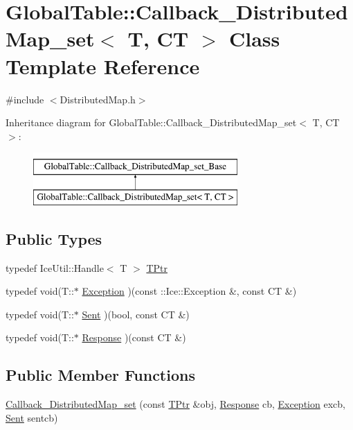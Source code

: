 \hypertarget{class_global_table_1_1_callback___distributed_map__set}{
\section{GlobalTable::Callback\_\-DistributedMap\_\-set$<$ T, CT $>$ Class Template Reference}
\label{class_global_table_1_1_callback___distributed_map__set}
}


{\ttfamily \#include $<$DistributedMap.h$>$}

Inheritance diagram for GlobalTable::Callback\_\-DistributedMap\_\-set$<$ T, CT $>$:\begin{figure}[H]
\begin{center}
\leavevmode
\includegraphics[height=2cm]{class_global_table_1_1_callback___distributed_map__set}
\end{center}
\end{figure}
\subsection*{Public Types}
\begin{DoxyCompactItemize}
\item 
typedef IceUtil::Handle$<$ T $>$ \hyperlink{class_global_table_1_1_callback___distributed_map__set_a3b50a68a36ed6f9c18c2f43921e7d2e9}{TPtr}
\item 
typedef void(T::$\ast$ \hyperlink{class_global_table_1_1_callback___distributed_map__set_a35bb7faf0c39455b3c6216c7c2d35b0f}{Exception} )(const ::Ice::Exception \&, const CT \&)
\item 
typedef void(T::$\ast$ \hyperlink{class_global_table_1_1_callback___distributed_map__set_acb1788ee23e85c2b36536177fc33e7d7}{Sent} )(bool, const CT \&)
\item 
typedef void(T::$\ast$ \hyperlink{class_global_table_1_1_callback___distributed_map__set_aff2fdd8c179bf018ed543b3153991bf9}{Response} )(const CT \&)
\end{DoxyCompactItemize}
\subsection*{Public Member Functions}
\begin{DoxyCompactItemize}
\item 
\hyperlink{class_global_table_1_1_callback___distributed_map__set_af55744d73b91381c76820d544ce6a292}{Callback\_\-DistributedMap\_\-set} (const \hyperlink{class_global_table_1_1_callback___distributed_map__set_a3b50a68a36ed6f9c18c2f43921e7d2e9}{TPtr} \&obj, \hyperlink{class_global_table_1_1_callback___distributed_map__set_aff2fdd8c179bf018ed543b3153991bf9}{Response} cb, \hyperlink{class_global_table_1_1_callback___distributed_map__set_a35bb7faf0c39455b3c6216c7c2d35b0f}{Exception} excb, \hyperlink{class_global_table_1_1_callback___distributed_map__set_acb1788ee23e85c2b36536177fc33e7d7}{Sent} sentcb)
\end{DoxyCompactItemize}

